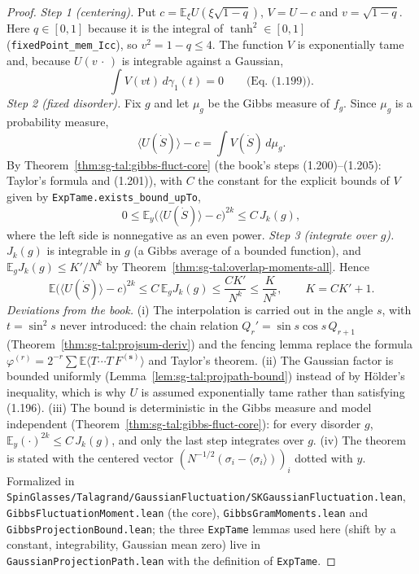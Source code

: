 \begin{proof}
  \leanok
\emph{Step 1 (centering).} Put $c=\mathbb E_\xi U(\xi\sqrt{1-q})$, $V=U-c$ and $v=\sqrt{1-q}$. Here $q\in[0,1]$ because it is the integral of $\tanh^2\in[0,1]$ (\texttt{fixedPoint\_mem\_Icc}), so $v^2=1-q\le4$. The function $V$ is exponentially tame and, because $U(v\,\cdot\,)$ is integrable against a Gaussian,
\[
\int V(vt)\,d\gamma_1(t)=0\qquad\text{(Eq.~(1.199))}.
\]
\emph{Step 2 (fixed disorder).} Fix $g$ and let $\mu_g$ be the Gibbs measure of $f_g$. Since $\mu_g$ is a probability measure,
\[
\langle U(\dot S)\rangle-c=\int V(\dot S)\,d\mu_g .
\]
By Theorem~\ref{thm:sg-tal:gibbs-fluct-core} (the book's steps (1.200)--(1.205): Taylor's formula and (1.201)), with $C$ the constant for the explicit bounds of $V$ given by \texttt{ExpTame.exists\_bound\_upTo},
\[
0\le\mathbb E_y\big(\langle U(\dot S)\rangle-c\big)^{2k}\le C\,J_k(g),
\]
where the left side is nonnegative as an even power.
\emph{Step 3 (integrate over $g$).} $J_k(g)$ is integrable in $g$ (a Gibbs average of a bounded function), and $\mathbb E_gJ_k(g)\le K'/N^k$ by Theorem~\ref{thm:sg-tal:overlap-moments-all}. Hence
\[
\mathbb E\Big(\langle U(\dot S)\rangle-c\Big)^{2k}\le C\,\mathbb E_gJ_k(g)\le\frac{C K'}{N^k}\le\frac K{N^k},\qquad K=CK'+1 .
\]
\emph{Deviations from the book.}  (i) The interpolation is carried out in the angle $s$, with $t=\sin^2s$ never introduced: the chain relation $Q_r'=\sin s\cos s\,Q_{r+1}$ (Theorem~\ref{thm:sg-tal:projsum-deriv}) and the fencing lemma replace the formula $\varphi^{(r)}=2^{-r}\sum\mathbb E\langle T\cdots T\,F^{(\mathbf s)}\rangle$ and Taylor's theorem.  (ii) The Gaussian factor is bounded uniformly (Lemma~\ref{lem:sg-tal:projpath-bound}) instead of by H\"older's inequality, which is why $U$ is assumed exponentially tame rather than satisfying (1.196).
(iii) The bound is deterministic in the Gibbs measure and model independent (Theorem~\ref{thm:sg-tal:gibbs-fluct-core}): for every disorder $g$, $\mathbb E_y(\cdot)^{2k}\le C\,J_k(g)$, and only the last step integrates over $g$.  (iv) The theorem is stated with the centered vector $(N^{-1/2}(\sigma_i-\langle\sigma_i\rangle))_i$ dotted with $y$.
Formalized in \texttt{SpinGlasses/Talagrand/GaussianFluctuation/SKGaussianFluctuation.lean}, \texttt{GibbsFluctuationMoment.lean} (the core), \texttt{GibbsGramMoments.lean} and \texttt{GibbsProjectionBound.lean}; the three \texttt{ExpTame} lemmas used here (shift by a constant, integrability, Gaussian mean zero) live in \texttt{GaussianProjectionPath.lean} with the definition of \texttt{ExpTame}.
\end{proof}

